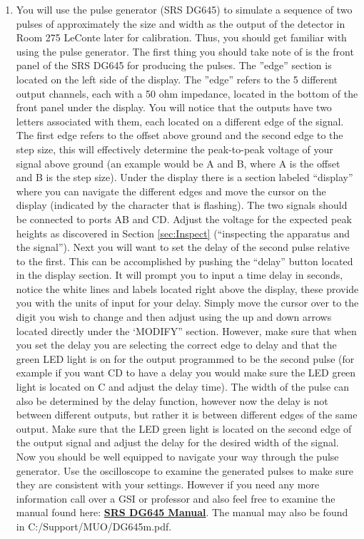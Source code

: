 \documentclass{../lab}
\begin{document}
\begin{enumerate}
    \item You will use the pulse generator (SRS DG645) to simulate a sequence of two pulses of approximately the size and width as the output of the detector in Room 275 LeConte later for calibration. Thus, you should get familiar with using the pulse generator. The first thing you should take note of is the front panel of the SRS DG645 for producing the pulses. The ''edge'' section is located on the left side of the display. The ''edge'' refers to the 5 different output channels, each with a 50 ohm impedance, located in the bottom of the front panel under the display. You will notice that the outputs have two letters associated with them, each located on a different edge of the signal. The first edge refers to the offset above ground and the second edge to the step size, this will effectively determine the peak-to-peak voltage of your signal above ground (an example would be A and B, where A is the offset and B is the step size). Under the display there is a section labeled ``display'' where you can navigate the different edges and move the cursor on the display (indicated by the character that is flashing). The two signals should be connected to ports AB and CD. Adjust the voltage for the expected peak heights as discovered in Section \ref{sec:Inspect} (``inspecting the apparatus and the signal''). Next you will want to set the delay of the second pulse relative to the first. This can be accomplished by pushing the ``delay'' button located in the display section. It will prompt you to input a time delay in seconds, notice the white lines and labels located right above the display, these provide you with the units of input for your delay. Simply move the cursor over to the digit you wish to change and then adjust using the up and down arrows located directly under the ‘MODIFY” section. However, make sure that when you set the delay you are selecting the correct edge to delay and that the green LED light is on for the output programmed to be the second pulse (for example if you want CD to have a delay you would make sure the LED green light is located on C and adjust the delay time). The width of the pulse can also be determined by the delay function, however now the delay is not between different outputs, but rather it is between different edges of the same output. Make sure that the LED green light is located on the second edge of the output signal and adjust the delay for the desired width of the signal. Now you should be well equipped to navigate your way through the pulse generator. Use the oscilloscope to examine the generated pulses to make sure they are consistent with your settings. However if you need any more information call over a GSI or professor and also feel free to examine the manual found here: \href{http://experimentationlab.berkeley.edu/sites/default/files/DG645manual.pdf}{\textbf{SRS DG645 Manual}}. The manual may also be found in C:/Support/MUO/DG645m.pdf.
    

\end{enumerate}
\end{document}
